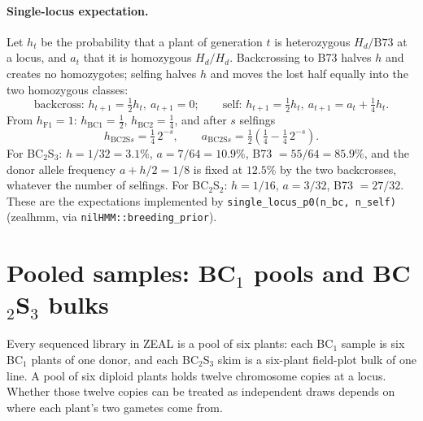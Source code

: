 \documentclass[11pt]{article}
\newcommand{\Hd}{H_d}
\newcommand{\code}[1]{\texttt{#1}}
\begin{document}
\paragraph{Single-locus expectation.} Let $h_t$ be the probability that a plant of generation $t$ is heterozygous $\Hd/\mathrm{B73}$ at a
locus, and $a_t$ that it is homozygous $\Hd/\Hd$. Backcrossing to B73 halves $h$ and creates no homozygotes; selfing halves $h$ and moves
the lost half equally into the two homozygous classes:
\begin{equation}
\text{backcross: } h_{t+1}=\tfrac12 h_t,\ a_{t+1}=0;\qquad
\text{self: } h_{t+1}=\tfrac12 h_t,\ a_{t+1}=a_t+\tfrac14 h_t .
\label{eq:recursion}
\end{equation}
From $h_{\mathrm{F1}}=1$: $h_{\mathrm{BC1}}=\tfrac12$, $h_{\mathrm{BC2}}=\tfrac14$, and after $s$ selfings
\begin{equation}
h_{\mathrm{BC2S}s}=\tfrac14\,2^{-s},\qquad a_{\mathrm{BC2S}s}=\tfrac12\left(\tfrac14-\tfrac14\,2^{-s}\right).
\end{equation}
For BC$_2$S$_3$: $h=1/32=3.1\%$, $a=7/64=10.9\%$, B73 $=55/64=85.9\%$, and the donor allele frequency $a+h/2=1/8$ is fixed at
$12.5\%$ by the two backcrosses, whatever the number of selfings. For BC$_2$S$_2$: $h=1/16$, $a=3/32$, B73 $=27/32$. These are the
expectations implemented by \code{single\_locus\_p0(n\_bc, n\_self)} (zealhmm, via \code{nilHMM::breeding\_prior}).

\section{Pooled samples: BC$_1$ pools and BC$_2$S$_3$ bulks}
\label{sec:pools}

Every sequenced library in ZEAL is a pool of six plants: each BC$_1$ sample is six BC$_1$ plants of one donor, and each BC$_2$S$_3$ skim is a
six-plant field-plot bulk of one line. A pool of six diploid plants holds twelve chromosome copies at a locus. Whether those twelve copies can
be treated as independent draws depends on where each plant's two gametes come from.
\end{document}
